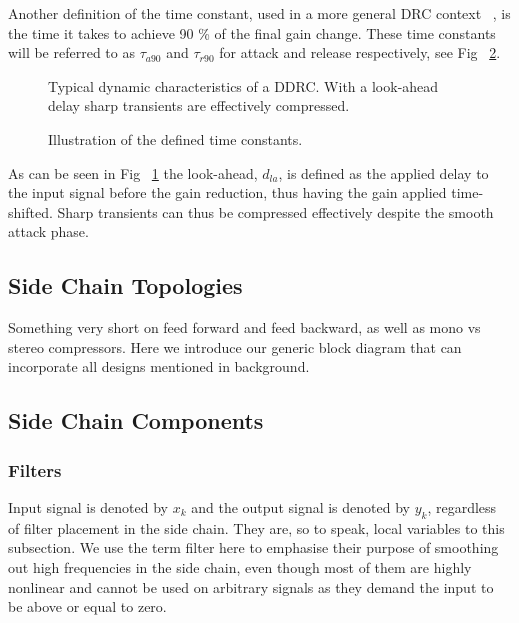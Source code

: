 \documentclass[../main2.tex]{subfiles}
\providecommand{\rootdir}{..}
\begin{document}
Another definition of the time constant, used in a more general DRC context ~\cite{mcnally1984dynamic}, is the time it takes to achieve 90 \% of the final gain change. These time constants will be referred to as $\tau_{a90}$ and $\tau_{r90}$ for attack and release respectively, see Fig ~\ref{fig:time_constants}.
\begin{figure}
\centerline{}
\caption{Typical dynamic characteristics of a DDRC. With a look-ahead delay sharp transients are effectively compressed.}
\label{fig:typical_envelope_detailed}
\end{figure}
\begin{figure}
\centerline{}
\caption{Illustration of the defined time constants.}
\label{fig:time_constants}
\end{figure}
As can be seen in Fig ~\ref{fig:typical_envelope_detailed} the look-ahead, $d_{la}$, is defined as the applied delay to the input signal before the gain reduction, thus having the gain applied time-shifted. Sharp transients can thus be compressed effectively despite the smooth attack phase.

\subsection{Side Chain Topologies}
Something very short on feed forward and feed backward, as well as mono vs stereo compressors.
Here we introduce our generic block diagram that can incorporate all designs mentioned in background.





\subsection{Side Chain Components}

\subsubsection{Filters}
Input signal is denoted by $x_k$ and the output signal is denoted by $y_k$, regardless of filter placement in the side chain. They are, so to speak, local variables to this subsection. We use the term filter here to emphasise their purpose of smoothing out high frequencies in the side chain, even though most of them are highly nonlinear and cannot be used on arbitrary signals as they demand the input to be above or equal to zero.
\end{document}
